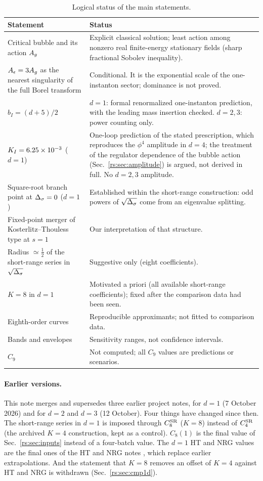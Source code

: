 \begin{table}[htbp]\centering\small
\renewcommand{\arraystretch}{1.2}
\begin{tabular}{@{}>{\raggedright\arraybackslash}p{}>{\raggedright\arraybackslash}p{}@{}}
\toprule
Statement & Status\\ \midrule
Critical bubble and its action $A_g$ & Explicit classical solution; least action among nonzero real finite-energy stationary fields (sharp fractional Sobolev inequality).\\
$A_\epsilon=3A_g$ as the nearest singularity of the full Borel transform & Conditional. It is the exponential scale of the one-instanton sector; dominance is not proved.\\
$b_I=(d+5)/2$ & $d=1$: formal renormalized one-instanton prediction, with the leading mass insertion checked. $d=2,3$: power counting only.\\
$K_I=6.25\times10^{-3}$ ($d=1$) & One-loop prediction of the stated prescription, which reproduces the $\phi^4$ amplitude in $d=4$; the treatment of the regulator dependence of the bubble action (Sec.~\ref{rs:sec:amplitude}) is argued, not derived in full. No $d=2,3$ amplitude.\\
Square-root branch point at $\Delta_\sigma=0$ ($d=1$) & Established within the short-range construction: odd powers of $\sqrt{\Delta_\sigma}$ come from an eigenvalue splitting.\\
Fixed-point merger of Kosterlitz--Thouless type at $s=1$ & Our interpretation of that structure.\\
Radius $\simeq\frac12$ of the short-range series in $\sqrt{\Delta_\sigma}$ & Suggestive only (eight coefficients).\\
$K=8$ in $d=1$ & Motivated a priori (all available short-range coefficients); fixed after the comparison data had been seen.\\
Eighth-order curves & Reproducible approximants; not fitted to comparison data.\\
Bands and envelopes & Sensitivity ranges, not confidence intervals.\\
$C_9$ & Not computed; all $C_9$ values are predictions or scenarios.\\
\bottomrule
\end{tabular}
\caption{Logical status of the main statements.}
\label{rs:tab:status}
\end{table}

\paragraph{Earlier versions.} This note merges and supersedes three earlier project notes,
for $d=1$ (7 October 2026) and for $d=2$ and $d=3$ (12 October). Four things have changed
since then. The short-range series in $d=1$ is imposed through $C^{\mathrm{SR}}_8$ ($K=8$) instead of
$C^{\mathrm{SR}}_4$ (the archived $K=4$ construction, kept as a control). $C_8(1)$ is the final value of
Sec.~\ref{rs:sec:inputs} instead of a four-batch value. The $d=1$ HT and NRG values are the final
ones of the HT and NRG notes \cite{rs:noteHT,rs:noteNRG}, which replace earlier extrapolations.
And the statement that $K=8$ removes an offset of $K=4$ against HT and NRG is withdrawn
(Sec.~\ref{rs:sec:cmp1d}).

